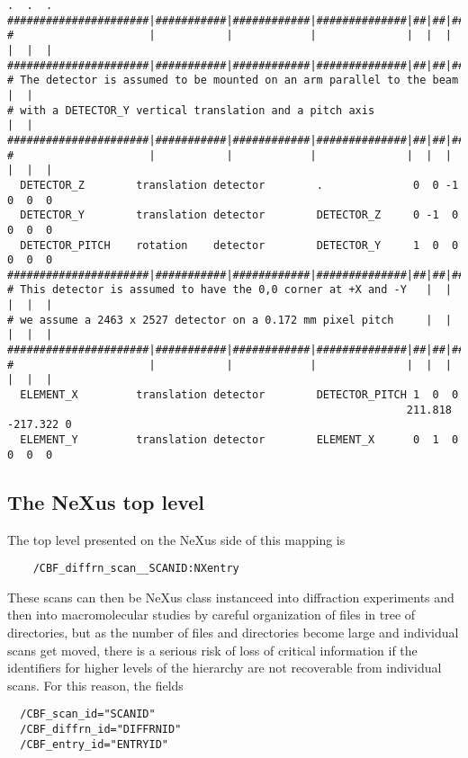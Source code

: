 \documentclass[11pt]{article}
\begin{document}
{\begin{verbatim}
.  .  .
######################|###########|############|##############|##|##|###|##|##|
#                     |           |            |              |  |  |   |  |  |
######################|###########|############|##############|##|##|###|##|##|
# The detector is assumed to be mounted on an arm parallel to the beam     |  |
# with a DETECTOR_Y vertical translation and a pitch axis                  |  |
######################|###########|############|##############|##|##|###|##|##|
#                     |           |            |              |  |  |   |  |  |
  DETECTOR_Z        translation detector        .              0  0 -1  0  0  0
  DETECTOR_Y        translation detector        DETECTOR_Z     0 -1  0  0  0  0
  DETECTOR_PITCH    rotation    detector        DETECTOR_Y     1  0  0  0  0  0
######################|###########|############|##############|##|##|###|##|##|
# This detector is assumed to have the 0,0 corner at +X and -Y   |  |   |  |  |
# we assume a 2463 x 2527 detector on a 0.172 mm pixel pitch     |  |   |  |  |
######################|###########|############|##############|##|##|###|##|##|
#                     |           |            |              |  |  |   |  |  |
  ELEMENT_X         translation detector        DETECTOR_PITCH 1  0  0
                                                              211.818 -217.322 0
  ELEMENT_Y         translation detector        ELEMENT_X      0  1  0   0  0  0
\end{verbatim}}


\subsection{The NeXus top level}
\label{The NeXus top level}


The top level presented on the NeXus side of this mapping is 

\begin{verbatim}
    /CBF_diffrn_scan__SCANID:NXentry
\end{verbatim}

These scans can then be NeXus class instanceed into diffraction experiments and then
into macromolecular studies by careful organization of files in
tree of directories, but as the number of files and directories become
large and individual scans get moved, there is a serious risk
of loss of critical information if the identifiers for higher levels
of the hierarchy are not recoverable from individual scans.  For
this reason, the fields

\begin{verbatim}
  /CBF_scan_id="SCANID"
  /CBF_diffrn_id="DIFFRNID"
  /CBF_entry_id="ENTRYID"
\end{verbatim}
\end{document}
